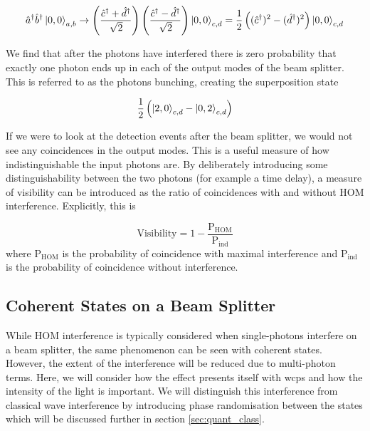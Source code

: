 \begin{equation}
	\hat{a}^\dagger \hat{b}^\dagger \ket{0,0}_{a,b} \rightarrow \left( \frac{\hat{c}^\dagger + \hat{d}^\dagger}{\sqrt{2}} \right)  \left( \frac{\hat{c}^\dagger - \hat{d}^\dagger}{\sqrt{2}} \right)  \ket{0,0}_{c,d} = \frac{1}{2}\left((\hat{c}^\dagger)^2 - (\hat{d}^\dagger)^2 \right)\ket{0,0}_{c,d}
\end{equation}

We find that after the photons have interfered there is zero probability that exactly one photon ends up in each of the output modes of the beam splitter. This is referred to as the photons bunching, creating the superposition state

\begin{equation}
	\frac{1}{2}\left(\ket{2,0}_{c,d} - \ket{0,2}_{c,d}\right)
\end{equation}

If we were to look at the detection events after the beam splitter, we would not see any coincidences in the output modes. This is a useful measure of how indistinguishable the input photons are. By deliberately introducing some distinguishability between the two photons (for example a time delay), a measure of visibility can be introduced as the ratio of coincidences with and without \ac{HOM} interference.  Explicitly, this is

\begin{equation}
	\text{Visibility} = 1 - \frac{\text{P}_\text{HOM}}{\text{P}_\text{ind}}
\end{equation}
where $\text{P}_\text{HOM}$ is the probability of coincidence with maximal interference and $\text{P}_\text{ind}$ is the probability of coincidence without interference.

\subsection{Coherent States on a Beam Splitter}

While \ac{HOM} interference is typically considered when single-photons interfere on a beam splitter, the same phenomenon can be seen with coherent states.  However, the extent of the interference will be reduced due to multi-photon terms. Here, we will consider how the effect presents itself with \acp{wcp} and how the intensity of the light is important. We will distinguish this interference from classical wave interference by introducing phase randomisation between the states which will be discussed further in section \ref{sec:quant_class}.

